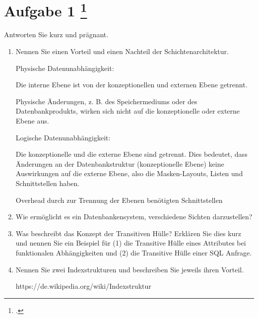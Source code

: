 \documentclass{lehramt-informatik-aufgabe}
\begin{document}
\section{Aufgabe 1
\footcite{examen:66116:2019:09}}

Antworten Sie kurz und prägnant.

\begin{enumerate}


\item Nennen Sie einen Vorteil und einen Nachteil der
Schichtenarchitektur.

\begin{liAntwort}

Physische Datenunabhängigkeit:

Die interne Ebene ist von der konzeptionellen und externen Ebene getrennt.

Physische Änderungen, z. B. des Speichermediums oder des
Datenbankprodukts, wirken sich nicht auf die konzeptionelle oder externe
Ebene aus.

Logische Datenunabhängigkeit:

Die konzeptionelle und die externe Ebene sind getrennt. Dies bedeutet,
dass Änderungen an der Datenbankstruktur (konzeptionelle Ebene) keine
Auswirkungen auf die externe Ebene, also die Masken-Layouts, Listen und
Schnittstellen haben.



Overhead durch zur Trennung der Ebenen benötigten Schnittstellen
\end{liAntwort}


\item Wie ermöglicht es ein Datenbankensystem, verschiedene Sichten
darzustellen?


\item Was beschreibt das Konzept der Transitiven Hülle? Erklären Sie
dies kurz und nennen Sie ein Beispiel für (1) die Transitive Hülle eines
Attributes bei funktionalen Abhängigkeiten und (2) die Transitive Hülle
einer SQL Anfrage.


\item Nennen Sie zwei Indexstrukturen und beschreiben Sie jeweils ihren
Vorteil.

\begin{liAntwort}
https://de.wikipedia.org/wiki/Indexstruktur
\end{liAntwort}

\end{enumerate}
\end{document}
